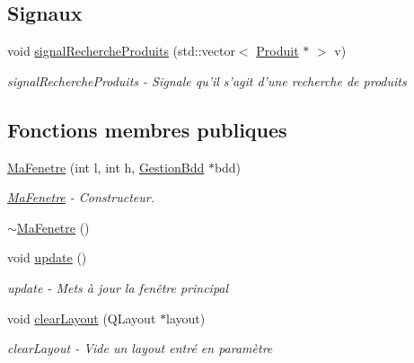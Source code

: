 \subsection*{Signaux}
\begin{DoxyCompactItemize}
\item 
void \hyperlink{class_ma_fenetre_a75cd895beb38fe68a4319eb6c37ac8ee}{signal\-Recherche\-Produits} (std\-::vector$<$ \hyperlink{class_produit}{Produit} $\ast$ $>$ v)
\begin{DoxyCompactList}\small\item\em signal\-Recherche\-Produits -\/ Signale qu'il s'agit d'une recherche de produits \end{DoxyCompactList}\end{DoxyCompactItemize}
\subsection*{Fonctions membres publiques}
\begin{DoxyCompactItemize}
\item 
\hyperlink{class_ma_fenetre_ae39212ca7a4d4b4c99a13b1d5eb063fa}{Ma\-Fenetre} (int l, int h, \hyperlink{class_gestion_bdd}{Gestion\-Bdd} $\ast$bdd)
\begin{DoxyCompactList}\small\item\em \hyperlink{class_ma_fenetre}{Ma\-Fenetre} -\/ Constructeur. \end{DoxyCompactList}\item 
\hyperlink{class_ma_fenetre_a2396ba2918e49df8d0c4a8c70f927151}{$\sim$\-Ma\-Fenetre} ()
\item 
void \hyperlink{class_ma_fenetre_a342da912af9b611d47229fd190d68522}{update} ()
\begin{DoxyCompactList}\small\item\em update -\/ Mets à jour la fenêtre principal \end{DoxyCompactList}\item 
void \hyperlink{class_ma_fenetre_a4bc520a56473760bb8433a1de67da378}{clear\-Layout} (Q\-Layout $\ast$layout)
\begin{DoxyCompactList}\small\item\em clear\-Layout -\/ Vide un layout entré en paramètre \end{DoxyCompactList}\end{DoxyCompactItemize}
